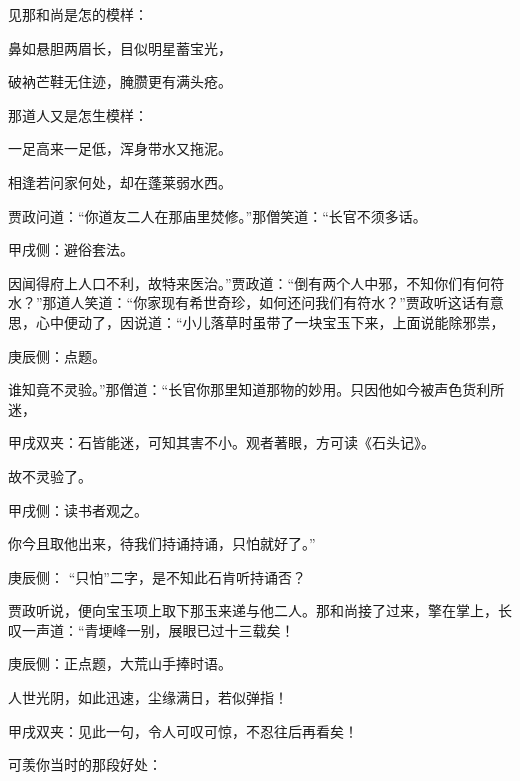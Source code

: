 \begin{parag}
    见那和尚是怎的模样：
\end{parag}


\begin{poem}
    \begin{pl}鼻如悬胆两眉长，目似明星蓄宝光，\end{pl}

    \begin{pl}破衲芒鞋无住迹，腌臜更有满头疮。\end{pl}
\end{poem}


\begin{parag}
    那道人又是怎生模样：
\end{parag}


\begin{poem}
    \begin{pl}一足高来一足低，浑身带水又拖泥。\end{pl}

    \begin{pl}相逢若问家何处，却在蓬莱弱水西。\end{pl}
\end{poem}


\begin{parag}
    贾政问道：“你道友二人在那庙里焚修。”那僧笑道：“长官不须多话。\begin{note}甲戌侧：避俗套法。\end{note}因闻得府上人口不利，故特来医治。”贾政道：“倒有两个人中邪，不知你们有何符水？”那道人笑道：“你家现有希世奇珍，如何还问我们有符水？”贾政听这话有意思，心中便动了，因说道：“小儿落草时虽带了一块宝玉下来，上面说能除邪祟，\begin{note}庚辰侧：点题。\end{note}谁知竟不灵验。”那僧道：“长官你那里知道那物的妙用。只因他如今被声色货利所迷，\begin{note}甲戌双夹：石皆能迷，可知其害不小。观者著眼，方可读《石头记》。\end{note}故不灵验了。\begin{note}甲戌侧：读书者观之。\end{note}你今且取他出来，待我们持诵持诵，只怕就好了。”\begin{note}庚辰侧： “只怕”二字，是不知此石肯听持诵否？\end{note}
\end{parag}


\begin{parag}
    贾政听说，便向宝玉项上取下那玉来递与他二人。那和尚接了过来，擎在掌上，长叹一声道：“青埂峰一别，展眼已过十三载矣！\begin{note}庚辰侧：正点题，大荒山手捧时语。\end{note}人世光阴，如此迅速，尘缘满日，若似弹指！\begin{note}甲戌双夹：见此一句，令人可叹可惊，不忍往后再看矣！\end{note}可羡你当时的那段好处：
\end{parag}


